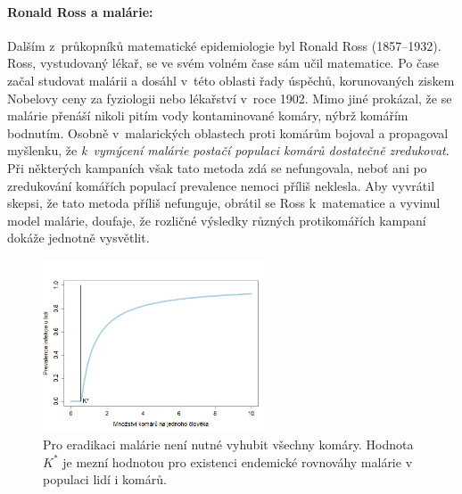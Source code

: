 
\paragraph{Ronald Ross a malárie:} Dalším z~průkopníků matematické epidemiologie byl Ronald Ross (1857--1932). Ross, vystudovaný lékař, se ve svém volném čase sám učil matematice. Po čase začal studovat malárii a dosáhl v~této oblasti řady úspěchů, korunovaných ziskem Nobelovy ceny za fyziologii nebo lékařství v~roce 1902. Mimo jiné prokázal, že se malárie přenáší nikoli pitím vody kontaminované komáry, nýbrž komářím bodnutím. Osobně v~malarických oblastech proti komárům bojoval a propagoval myšlenku, že \emph{k~vymýcení malárie postačí populaci komárů dostatečně zredukovat}. Při některých kampaních však tato metoda zdá se nefungovala, neboť ani po zredukování komářích populací prevalence nemoci příliš neklesla. Aby vyvrátil skepsi, že tato metoda příliš nefunguje, obrátil se Ross k~matematice a vyvinul model malárie, doufaje, že rozličné výsledky různých protikomářích kampaní dokáže jednotně vysvětlit. 

\begin{figure}[ht]
\begin{center}
	\includegraphics[width=0.6\textwidth]{pic/ross_plot.png}
\end{center}
\caption{Pro eradikaci malárie není nutné vyhubit všechny komáry. Hodnota $K^*$ je mezní hodnotou pro existenci endemické rovnováhy malárie v populaci lidí i komárů.}
\label{ross1}
\end{figure}


